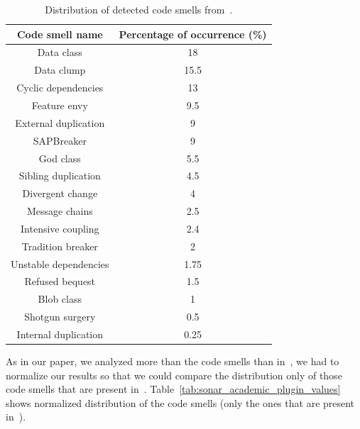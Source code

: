 \begin{table}
    \begin{center}
        \begin{tabular} {| c | c |}
            \hline
            \textbf{Code smell name} & \textbf{Percentage of occurrence (\%)} \\ \hline
            Data class & 18 \\ \hline
            Data clump & 15.5 \\ \hline
            Cyclic dependencies & 13 \\ \hline
            Feature envy & 9.5 \\ \hline
            External duplication & 9 \\ \hline
            SAPBreaker & 9 \\ \hline
            God class & 5.5 \\ \hline
            Sibling duplication & 4.5 \\ \hline
            Divergent change & 4 \\ \hline
            Message chains & 2.5 \\ \hline
            Intensive coupling & 2.4 \\ \hline
            Tradition breaker & 2 \\ \hline
            Unstable dependencies & 1.75 \\ \hline
            Refused bequest & 1.5 \\ \hline
            Blob class & 1 \\ \hline
            Shotgun surgery & 0.5 \\ \hline
            Internal duplication & 0.25 \\ \hline
        \end{tabular}
        \caption{Distribution of detected code smells from~\cite{mannan2016understanding}.}
        \label{tab:understading_andoid_smells_values}
    \end{center}
\end{table}

As in our paper, we analyzed more than the code smells than in~\cite{mannan2016understanding}, we had to normalize
our results so that we could compare the distribution only of those code smells that are present in~\cite{mannan2016understanding}.
Table~\ref{tab:sonar_academic_plugin_values} shows normalized distribution of the code smells (only the ones that
are present in~\cite{mannan2016understanding}).

